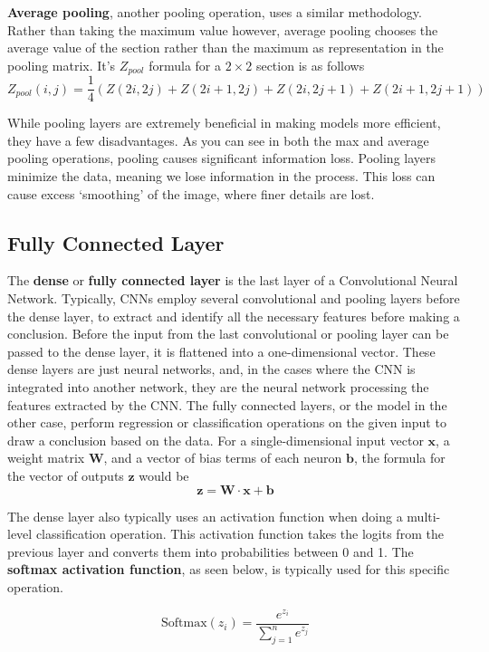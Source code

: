         \textbf{Average pooling}, another pooling operation, uses a similar methodology. Rather than taking the maximum value however, average pooling chooses the average value of the section rather than the maximum as representation in the pooling matrix. It's $Z_{pool}$ formula for a $2 \times 2$ section is as follows
        $$Z_{pool}(i, j) = \frac{1}{4} (Z(2i,2j) + Z(2i+1,2j) + Z(2i,2j+1) + Z(2i+1,2j+1))$$

        While pooling layers are extremely beneficial in making models more efficient, they have a few disadvantages. As you can see in both the max and average pooling operations, pooling causes significant information loss. Pooling layers minimize the data, meaning we lose information in the process. This loss can cause excess `smoothing' of the image, where finer details are lost.

        \subsection{Fully Connected Layer}
        The \textbf{dense} or \textbf{fully connected layer} is the last layer of a Convolutional Neural Network. Typically, CNNs employ several convolutional and pooling layers before the dense layer, to extract and identify all the necessary features before making a conclusion. Before the input from the last convolutional or pooling layer can be passed to the dense layer, it is flattened into a one-dimensional vector. These dense layers are just neural networks, and, in the cases where the CNN is integrated into another network, they are the neural network processing the features extracted by the CNN. The fully connected layers, or the model in the other case, perform regression or classification operations on the given input to draw a conclusion based on the data. For a single-dimensional input vector $\textbf{x}$, a weight matrix $\textbf{W}$, and a vector of bias terms of each neuron $\textbf{b}$, the formula for the vector of outputs $\textbf{z}$ would be
        $$\textbf{z} = \textbf{W} \cdot \textbf{x} + \textbf{b}$$

        The dense layer also typically uses an activation function when doing a multi-level classification operation. This activation function takes the logits from the previous layer and converts them into probabilities between 0 and 1. The \textbf{softmax activation function}, as seen below, is typically used for this specific operation. 
        
        $$\mathrm{Softmax}(z_i) = \frac{e^{z_i}}{\sum^{n}_{j=1} e^{z_j}}$$
        
